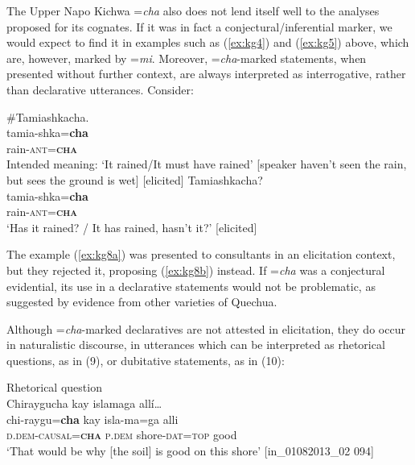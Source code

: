 \documentclass[output=paper]{langscibook}
\begin{document}
The Upper Napo Kichwa =\textit{cha} also does not lend itself well to the analyses proposed for its cognates. If it was in fact a conjectural/inferential marker, we would expect to find it in examples such as (\ref{ex:kg4}) and (\ref{ex:kg5}) above, which are, however, marked by =\textit{mi}. Moreover, =\textit{cha}-marked statements, when presented without further context, are always interpreted as interrogative, rather than declarative utterances. Consider:

\begin{exe}
	\ex \label{ex:kg8}
	\begin{xlist}
		\ex \label{ex:kg8a}
		\glll \#Tamiashkacha.\\
		 tamia-shka=\textbf{cha}\\
		rain-\textsc{ant}=\textbf{\textsc{cha}}\\
		\trans Intended meaning: ‘It rained/It must have rained’ [speaker haven’t seen the rain, but 	sees the ground is wet] [elicited]
		\ex  \label{ex:kg8b}
		\glll Tamiashkacha?\\
		tamia-shka=\textbf{cha}\\
        rain-\textsc{ant}=\textbf{\textsc{cha}}\\
        \trans ‘Has it rained? / It has rained, hasn’t it?’ [elicited]
	\end{xlist}
\end{exe}


The example (\ref{ex:kg8a}) was presented to consultants in an elicitation context, but they rejected it, proposing (\ref{ex:kg8b}) instead. If =\textit{cha} was a conjectural evidential, its use in a declarative statements would not be problematic, as suggested by evidence from other varieties of Quechua.

Although =\textit{cha}-marked declaratives are not attested in elicitation, they do occur in naturalistic discourse, in utterances which can be interpreted as rhetorical questions, as in (9), or dubitative statements, as in (10):

\begin{exe}
	\ex Rhetorical question\label{ex:kg9}\\
	\glll Chiraygucha kay islamaga allí…\\
	chi-raygu=\textbf{cha} kay isla-ma=ga alli\\
	\textsc{d}.\textsc{dem}-\textsc{causal}=\textbf{\textsc{cha}}	 \textsc{p}.\textsc{dem}	 shore-\textsc{dat}=\textsc{top} good\\
	\trans ‘That would be why [the soil] is good on this shore’ [in\_01082013\_02 094]
\end{exe}
\end{document}
